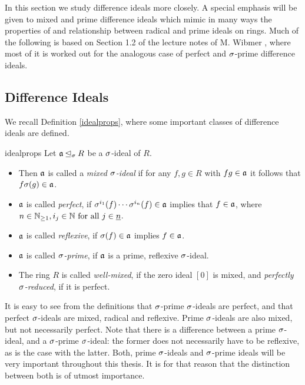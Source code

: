In this section we study difference ideals more closely. A special emphasis will be given to mixed and prime difference ideals which mimic in many ways the properties of and relationship between radical and prime ideals on rings.
Much of the following is based on Section 1.2 of the lecture notes of M. Wibmer \cite{wibmer}, where most of it is worked out for the analogous case of perfect and $\sigma$-prime difference ideals. \\

\subsection{Difference Ideals}

We recall Definition \ref{idealprops}, where some important classes of difference ideals are defined.

\begin{repdefn}{idealprops}
Let  $\mathfrak{a} \unlhd_{\sigma} R$ be a $\sigma$-ideal of $R$. 
\begin{itemize}
\item Then $\mathfrak{a}$ is called a \emph{mixed $\sigma$-ideal} if for any $f,g \in R$ with $fg \in \mathfrak{a}$ it follows that $f \sigma(g) \in \mathfrak{a}$. 
\item $\mathfrak{a}$ is called \emph{perfect}, if $\sigma^{i_1}(f) \cdots \sigma^{i_n}(f) \in \mathfrak{a}$ implies that $f \in \mathfrak{a}$, where $n \in \mathbb{N}_{\geq1}, i_j \in \mathbb{N} \text{ for all } j \in \underline{n}$. 
\item $\mathfrak{a}$ is called \emph{reflexive}, if $\sigma(f) \in \mathfrak{a}$ implies $f \in \mathfrak{a}$. 
\item $\mathfrak{a}$ is called \emph{$\sigma$-prime}, if $\mathfrak{a}$ is a prime, reflexive $\sigma$-ideal. 
\item The ring $R$ is called \emph{well-mixed}, if the zero ideal $[0]$ is mixed, and \emph{perfectly $\sigma$-reduced}, if it is perfect. 
\end{itemize}
\end{repdefn}

\begin{rem}\label{rempropideals}
It is easy to see from the definitions that $\sigma$-prime $\sigma$-ideals are perfect, and that perfect $\sigma$-ideals are mixed, radical and reflexive. Prime $\sigma$-ideals are also mixed, but not necessarily perfect. Note that there is a difference between a prime $\sigma$-ideal, and a $\sigma$-prime $\sigma$-ideal:
the former does not necessarily have to be reflexive, as is the case with the latter. Both, prime $\sigma$-ideals and $\sigma$-prime ideals will be very important throughout this thesis. It is for that reason that the distinction between both is of utmost importance.
\end{rem}

